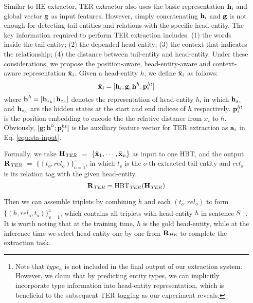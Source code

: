 \documentclass{ecai}
\begin{document}
Similar to HE extractor, TER extractor also uses the basic representation $\boldsymbol{\rm{h}}_i$ and global vector $\boldsymbol{\rm{g}}$ as input features. 
However, simply concatenating $\boldsymbol{\rm{h}}_i$ and $\boldsymbol{\rm{g}}$ is not enough for detecting tail-entities and relations with the specific head-entity.
The key information required to perform TER extraction includes: 
(1) the words inside the tail-entity; 
(2) the depended head-entity; 
(3) the context that indicates the relationship; 
(4) the distance between tail-entity and head-entity. 
Under these considerations, we propose the position-aware, head-entity-aware and context-aware representation $\bar{\boldsymbol{\rm{x}}}_i$. 
Given a head-entity $h$, we define $\bar{\boldsymbol{\rm{x}}}_i$ as follows:
\begin{equation}
   \bar{\boldsymbol{\rm{x}}}_i = [\boldsymbol{\rm{h}}_i;\boldsymbol{\rm{g}};\boldsymbol{\rm{h}}^{h};\boldsymbol{\rm{p}}_i^{ht}]
\end{equation}
where $\boldsymbol{\rm{h}}^{h}=[\boldsymbol{\rm{h}}_{s_{h}};\boldsymbol{\rm{h}}_{e_{h}}]$ denotes the representation of head-entity $h$, in which $\boldsymbol{\rm{h}}_{s_{h}}$ and  $\boldsymbol{\rm{h}}_{e_{h}}$ are the hidden states at the start and end indices of $h$ respectively.
 $\boldsymbol{\rm{p}}_i^{ht}$ is the position embedding to encode the the relative distance from $x_i$ to $h$. 
Obviously,   $[\boldsymbol{\rm{g}};\boldsymbol{\rm{h}}^{h};\boldsymbol{\rm{p}}_i^{ht}]$ is the auxiliary feature vector for TER extraction as $\boldsymbol{\rm{a}}_i$ in Eq. \ref{equ:sta-input}.


Formally, we take $\boldsymbol{\rm{H}}_{\text{\emph{TER}}}$ $=$ $\{\bar{\boldsymbol{\rm{x}}}_1, \cdots, \bar{\boldsymbol{\rm{x}}}_n\}$ as input to one HBT, and the output $\mathbf{R}_{\text{\emph{TER}}}$ $=$ $\{(t_o,rel_{o})\}_{o=1}^z$, in which $t_o$ is the $o$-th extracted tail-entity and $rel_{o}$ is its relation tag with the given head-entity. 
\begin{equation}
   \mathbf{R}_{\text{\emph{TER}}} = {\rm{HBT}}_{\text{\emph{TER}}}(\boldsymbol{\rm{H}}_{\text{\emph{TER}}} )
\end{equation} 

Then we can assemble triplets by combining $h$ and each $(t_o,rel_{o})$ to form $\{(h,rel_{o},t_{o})\}_{o=1}^z$, which contains all triplets with head-entity $h$ in sentence $S$ \footnote{Note that $type_{h}$ is not included in the final output of our extraction system. However, we claim that by predicting entity types, we can implicitly incorporate type information into head-entity representation, which is beneficial to the subsequent TER tagging as our experiment reveals.}.
It is worth noting that at the training time, $h$ is the gold head-entity, while at the inference time we select head-entity one by one from $\mathbf{R}_{\text{\emph{HE}}}$ to complete the extraction task.
\end{document}
